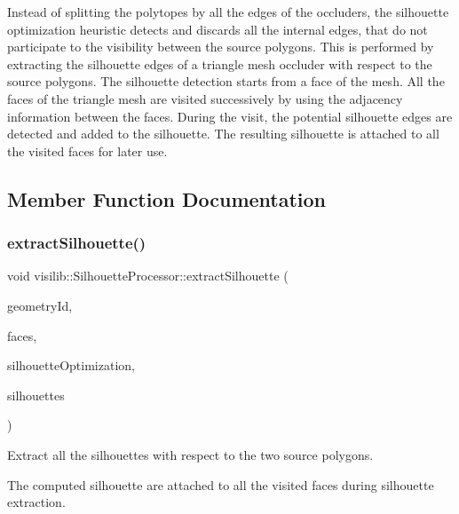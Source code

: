 Instead of splitting the polytopes by all the edges of the occluders, the silhouette optimization heuristic detects and discards all the internal edges, that do not participate to the visibility between the source polygons. This is performed by extracting the silhouette edges of a triangle mesh occluder with respect to the source polygons. The silhouette detection starts from a face of the mesh. All the faces of the triangle mesh are visited successively by using the adjacency information between the faces. During the visit, the potential silhouette edges are detected and added to the silhouette. The resulting silhouette is attached to all the visited faces for later use. 

\subsection{Member Function Documentation}
\mbox{\label{classvisilib_1_1_silhouette_processor_aecbc9e229dac1bb760f03d889aebd80a}} 
\subsubsection{\texorpdfstring{extractSilhouette()}{extractSilhouette()}}
{\footnotesize\ttfamily void visilib\+::\+Silhouette\+Processor\+::extract\+Silhouette (\begin{DoxyParamCaption}\item[{size\+\_\+t}]{geometry\+Id,  }\item[{const std\+::vector$<$ \mbox{\hyperlink{classvisilib_1_1_silhouette_mesh_face}{Silhouette\+Mesh\+Face}} $>$ \&}]{faces,  }\item[{bool}]{silhouette\+Optimization,  }\item[{std\+::vector$<$ \mbox{\hyperlink{classvisilib_1_1_visibility_silhouette}{Visibility\+Silhouette}} $\ast$ $>$ \&}]{silhouettes }\end{DoxyParamCaption})\hspace{0.3cm}{\ttfamily [inline]}}



Extract all the silhouettes with respect to the two source polygons. 

The computed silhouette are attached to all the visited faces during silhouette extraction. \mbox{\label{classvisilib_1_1_silhouette_processor_abe945efce3df48005a6927940d16773a}} 
